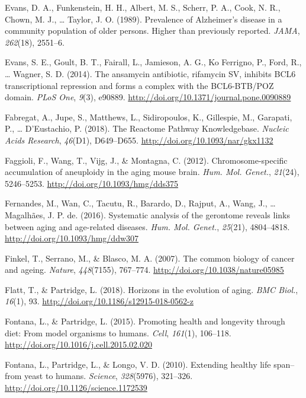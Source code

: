\documentclass[12pt,twoside]{unicam}
\begin{document}
\begin{cslreferences}
\leavevmode\hypertarget{ref-Evans1989}{}%
Evans, D. A., Funkenstein, H. H., Albert, M. S., Scherr, P. A., Cook, N. R., Chown, M. J., \ldots{} Taylor, J. O. (1989). Prevalence of Alzheimer's disease in a community population of older persons. Higher than previously reported. \emph{JAMA}, \emph{262}(18), 2551--6.

\leavevmode\hypertarget{ref-Evans2014}{}%
Evans, S. E., Goult, B. T., Fairall, L., Jamieson, A. G., Ko Ferrigno, P., Ford, R., \ldots{} Wagner, S. D. (2014). The ansamycin antibiotic, rifamycin SV, inhibits BCL6 transcriptional repression and forms a complex with the BCL6-BTB/POZ domain. \emph{PLoS One}, \emph{9}(3), e90889. \url{http://doi.org/10.1371/journal.pone.0090889}

\leavevmode\hypertarget{ref-Fabregat2018}{}%
Fabregat, A., Jupe, S., Matthews, L., Sidiropoulos, K., Gillespie, M., Garapati, P., \ldots{} D'Eustachio, P. (2018). The Reactome Pathway Knowledgebase. \emph{Nucleic Acids Research}, \emph{46}(D1), D649--D655. \url{http://doi.org/10.1093/nar/gkx1132}

\leavevmode\hypertarget{ref-Faggioli2012}{}%
Faggioli, F., Wang, T., Vijg, J., \& Montagna, C. (2012). Chromosome-specific accumulation of aneuploidy in the aging mouse brain. \emph{Hum. Mol. Genet.}, \emph{21}(24), 5246--5253. \url{http://doi.org/10.1093/hmg/dds375}

\leavevmode\hypertarget{ref-Fernandes2016}{}%
Fernandes, M., Wan, C., Tacutu, R., Barardo, D., Rajput, A., Wang, J., \ldots{} Magalhães, J. P. de. (2016). Systematic analysis of the gerontome reveals links between aging and age-related diseases. \emph{Hum. Mol. Genet.}, \emph{25}(21), 4804--4818. \url{http://doi.org/10.1093/hmg/ddw307}

\leavevmode\hypertarget{ref-Finkel2007}{}%
Finkel, T., Serrano, M., \& Blasco, M. A. (2007). The common biology of cancer and ageing. \emph{Nature}, \emph{448}(7155), 767--774. \url{http://doi.org/10.1038/nature05985}

\leavevmode\hypertarget{ref-Flatt2018}{}%
Flatt, T., \& Partridge, L. (2018). Horizons in the evolution of aging. \emph{BMC Biol.}, \emph{16}(1), 93. \url{http://doi.org/10.1186/s12915-018-0562-z}

\leavevmode\hypertarget{ref-Fontana2015}{}%
Fontana, L., \& Partridge, L. (2015). Promoting health and longevity through diet: From model organisms to humans. \emph{Cell}, \emph{161}(1), 106--118. \url{http://doi.org/10.1016/j.cell.2015.02.020}

\leavevmode\hypertarget{ref-Fontana2010}{}%
Fontana, L., Partridge, L., \& Longo, V. D. (2010). Extending healthy life span--from yeast to humans. \emph{Science}, \emph{328}(5976), 321--326. \url{http://doi.org/10.1126/science.1172539}


\end{cslreferences}
\end{document}
